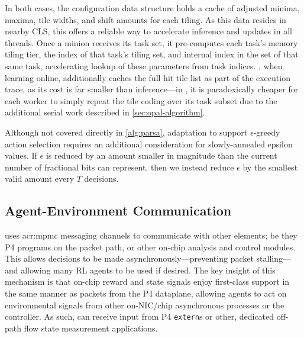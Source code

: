 In both cases, the configuration data structure holds a cache of adjusted minima, maxima, tile widths, and shift amounts for each tiling.
As this data resides in nearby CLS, this offers a reliable way to accelerate inference and updates in all \approachshort{} threads.
Once a \coopfw{} minion receives its task set, it pre-computes each task's memory tiling tier, the index of that task's tiling set, and internal index in the set of that same task, accelerating lookup of these parameters from task indices.
\Indfw{}, when learning online, additionally caches the full hit tile list as part of the execution trace, as its cost is far smaller than inference---in \Coopfw, it is paradoxically cheaper for each worker to simply repeat the tile coding over its task subset due to the additional serial work described in \cref{sec:opal-algorithm}.

Although not covered directly in \cref{alg:parsa}, adaptation to support $\epsilon$-greedy action selection requires an additional consideration for slowly-annealed epsilon values.
If $\epsilon$ is reduced by an amount smaller in magnitude than the current number of fractional bits can represent, then we instead reduce $\epsilon$ by the smallest valid amount every $T$ decisions.


\subsection{Agent-Environment Communication}\label{sec:agent-environment-communication}
\approachshort{} uses \gls{acr:mpmc} messaging channels to communicate with other elements; be they P4 programs on the packet path, or other on-chip analysis and control modules.
This allows decisions to be made asynchronously---preventing packet stalling---and allowing many RL agents to be used if desired.
The key insight of this mechanism is that on-chip reward and state signals enjoy first-class support in the same manner as packets from the P4 dataplane, allowing agents to act on environmental signals from other on-NIC/chip asynchronous processes or the controller.
As such, \approachshort{} can receive input from P4 \texttt{extern}s or other, dedicated off-path flow state measurement applications.

